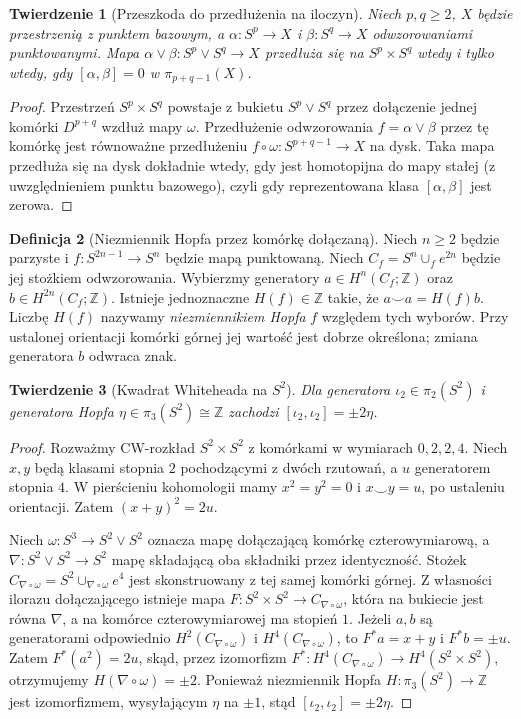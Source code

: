\documentclass[11pt,a4paper,oneside]{report}
\newcommand{\Z}{\mathbb{Z}}
\theoremstyle{plain}
\newtheorem{twierdzenie}{Twierdzenie}[section]
\theoremstyle{definition}
\newtheorem{definicja}[twierdzenie]{Definicja}
\theoremstyle{remark}
\begin{document}
\begin{twierdzenie}[Przeszkoda do przedłużenia na iloczyn]
\label{thm:whitehead-product-v7}
Niech $p,q\ge2$, $X$ będzie przestrzenią z punktem
bazowym, a $\alpha:S^p\to X$ i $\beta:S^q\to X$
odwzorowaniami punktowanymi. Mapa
$\alpha\vee\beta:S^p\vee S^q\to X$ przedłuża się
na $S^p\times S^q$ wtedy i tylko wtedy, gdy
$[\alpha,\beta]=0$ w $\pi_{p+q-1}(X)$.
\end{twierdzenie}
\begin{proof}
Przestrzeń $S^p\times S^q$ powstaje z bukietu
$S^p\vee S^q$ przez dołączenie jednej komórki
$D^{p+q}$ wzdłuż mapy $\omega$.
Przedłużenie odwzorowania $f=\alpha\vee\beta$
przez tę komórkę jest równoważne przedłużeniu
$f\circ\omega:S^{p+q-1}\to X$ na dysk.
Taka mapa przedłuża się na dysk dokładnie wtedy,
gdy jest homotopijna do mapy stałej (z uwzględnieniem
punktu bazowego), czyli gdy reprezentowana klasa
$[\alpha,\beta]$ jest zerowa.
\end{proof}

\begin{definicja}[Niezmiennik Hopfa przez komórkę dołączaną]
Niech $n\ge2$ będzie parzyste i
$f:S^{2n-1}\to S^n$ będzie mapą punktowaną.
Niech $C_f=S^n\cup_f e^{2n}$ będzie jej stożkiem
odwzorowania. Wybierzmy generatory
$a\in H^n(C_f;\Z)$ oraz $b\in H^{2n}(C_f;\Z)$.
Istnieje jednoznaczne $H(f)\in\Z$ takie, że
$a\smile a=H(f)b$. Liczbę $H(f)$ nazywamy
\emph{niezmiennikiem Hopfa} $f$ względem tych wyborów.
Przy ustalonej orientacji komórki górnej jej wartość
jest dobrze określona; zmiana generatora $b$ odwraca znak.
\end{definicja}

\begin{twierdzenie}[Kwadrat Whiteheada na \texorpdfstring{$S^2$}{S2}]
\label{thm:whitehead-square-v7}
Dla generatora $\iota_2\in\pi_2(S^2)$ i generatora
Hopfa $\eta\in\pi_3(S^2)\cong\Z$ zachodzi
$[\iota_2,\iota_2]=\pm2\eta$.
\end{twierdzenie}
\begin{proof}
Rozważmy CW-rozkład $S^2\times S^2$ z komórkami
w wymiarach $0,2,2,4$. Niech $x,y$ będą klasami
stopnia $2$ pochodzącymi z dwóch rzutowań, a $u$
generatorem stopnia $4$. W pierścieniu kohomologii
mamy $x^2=y^2=0$ i $x\smile y=u$,
po ustaleniu orientacji. Zatem
$(x+y)^2=2u$.

Niech $\omega:S^3\to S^2\vee S^2$ oznacza mapę
dołączającą komórkę czterowymiarową, a
$\nabla:S^2\vee S^2\to S^2$ mapę składającą oba
składniki przez identyczność. Stożek
$C_{\nabla\circ\omega}=S^2\cup_{\nabla\circ\omega}e^4$
jest skonstruowany z tej samej komórki górnej.
Z własności ilorazu dołączającego istnieje mapa
$F:S^2\times S^2\to C_{\nabla\circ\omega}$,
która na bukiecie jest równa $\nabla$, a na komórce
czterowymiarowej ma stopień $1$. Jeżeli $a,b$
są generatorami odpowiednio $H^2(C_{\nabla\circ\omega})$
i $H^4(C_{\nabla\circ\omega})$, to
$F^*a=x+y$ i $F^*b=\pm u$.
Zatem $F^*(a^2)=2u$, skąd, przez izomorfizm
$F^*:H^4(C_{\nabla\circ\omega})\to H^4(S^2\times S^2)$,
otrzymujemy $H(\nabla\circ\omega)=\pm2$.
Ponieważ niezmiennik Hopfa
$H:\pi_3(S^2)\to\Z$ jest izomorfizmem, wysyłającym
$\eta$ na $\pm1$, stąd $[\iota_2,\iota_2]=\pm2\eta$.
\end{proof}
\end{document}
